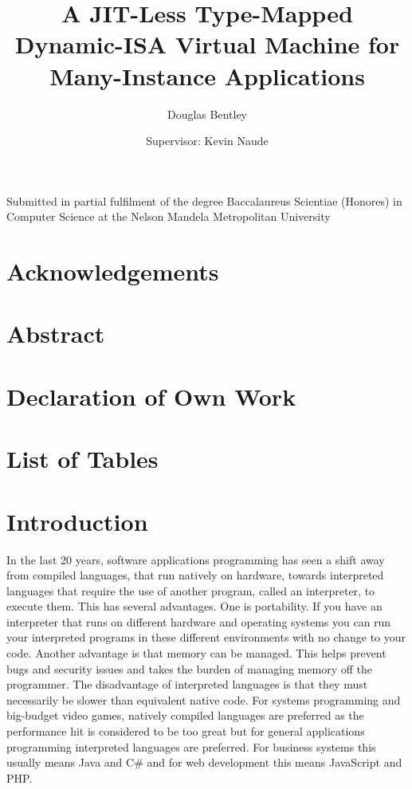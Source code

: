\documentclass[english,a4paper]{article}
\begin{document}
\title{A JIT-Less Type-Mapped Dynamic-ISA Virtual Machine for
  Many-Instance Applications}

\author{ Douglas Bentley \and Supervisor: Kevin Naude }

\maketitle

\begin{center}
Submitted in partial fulfilment of the degree Baccalaureus Scientiae
(Honores) in Computer Science at the Nelson Mandela Metropolitan
University
\end{center}

\newpage{}

\section*{Acknowledgements}

\newpage{}

\section*{Abstract}

\newpage{}

\section*{Declaration of Own Work}

\newpage{}

\listoffigures
\newpage{}

\section*{List of Tables}

\newpage{}

\tableofcontents
\newpage{}

\section{Introduction}

In the last 20 years, software applications programming has seen a
shift away from compiled languages, that run natively on hardware,
towards interpreted languages that require the use of another program,
called an interpreter, to execute them. This has several
advantages. One is portability. If you have an interpreter that runs
on different hardware and operating systems you can run your
interpreted programs in these different environments with no change to
your code. Another advantage is that memory can be managed. This helps
prevent bugs and security issues and takes the burden of managing
memory off the programmer. The disadvantage of interpreted languages
is that they must necessarily be slower than equivalent native
code. For systems programming and big-budget video games, natively
compiled languages are preferred as the performance hit is considered
to be too great but for general applications programming interpreted
languages are preferred. For business systems this usually means Java
and C\# and for web development this means JavaScript and PHP.
\end{document}
